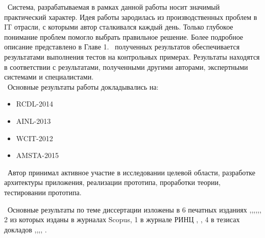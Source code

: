 \influence\ 
Система, разрабатываемая в рамках данной работы носит значимый практический характер. Идея работы зародилась из производственных проблем в IT отрасли, с которыми автор сталкивался каждый день. Только глубокое понимание проблем помогло выбрать правильное решение. Более подробное описание представлено в Главе 1.
\reliability\ полученных результатов обеспечивается результатами выполнения тестов на контрольных примерах. Результаты находятся в соответствии с результатами, полученными другими авторами, экспертными системами и специалистами. \\ 

\probation\
Основные результаты работы докладывались на:
\begin{itemize}
	\item RCDL-2014
	\item AINL-2013
	\item WCIT-2012
	\item AMSTA-2015
\end{itemize}

\contribution\ Автор принимал активное участие в исследовании целевой области, разработке архитектуры приложения, реализации прототипа, проработки теории, тестировании прототипа.

\publications\ Основные результаты по теме диссертации изложены в 6 печатных изданиях  \cite{Lobachevskii},\cite{WCIT-2012},\cite{RCDL-2014},\cite{AINL-2013},\cite{ISGZ},\cite{AMSTA-2015}, 
2 из которых изданы в журналах Scopus, 1 в журнале РИНЦ  \cite{ISGZ},
\cite{RCDL-2014}, \cite{AMSTA-2015} 
4 в тезисах докладов \cite{Lobachevskii},\cite{WCIT-2012},\cite{AINL-2013},\cite{ISGZ}, \cite{IJSE-1}.



